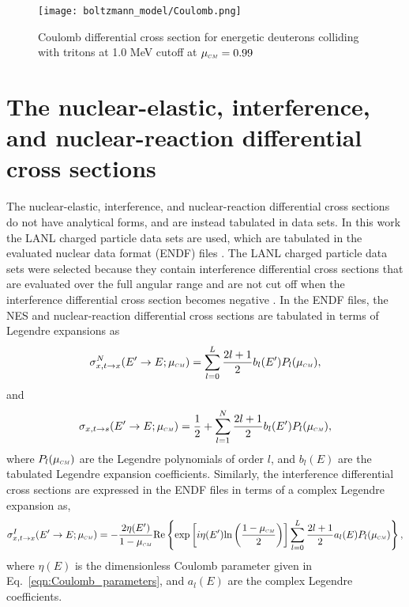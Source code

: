 \documentclass[../main.tex]{subfiles}
\begin{document}
\begin{figure}[!htb]
    \centering
    \texttt{[image: boltzmann\_model/Coulomb.png]}
    \caption{Coulomb differential cross section for energetic deuterons colliding with tritons at 1.0 MeV cutoff at $\mucm = 0.99$}
    \label{fig:sigma_c}
\end{figure}


\section{The nuclear-elastic, interference, and nuclear-reaction differential cross sections}
The nuclear-elastic, interference, and nuclear-reaction differential cross sections do not have analytical forms, and are instead tabulated in data sets. In this work the LANL charged particle data sets are used, which are tabulated in the evaluated nuclear data format (ENDF) files \cite{Brown-2018}. The LANL charged particle data sets were selected because they contain interference differential cross sections that are evaluated over the full angular range and are not cut off when the interference differential cross section becomes negative \cite{Perkins-1981} \cite{Hale-1983}. In the ENDF files, the NES and nuclear-reaction differential cross sections are tabulated in terms of Legendre expansions as
\begin{equation} \label{eqn:nes_differential cross section}
    \sigma_{x,t \rightarrow x}^N(E^{\prime} \rightarrow E; \mucm) = \sum_{l=0}^L \dfrac{2l+1}{2} b_l(E^{\prime}) P_l(\mucm),
\end{equation}
and
\begin{equation}\label{eqn:nuclear-reaction_differential cross section}
    \sigma_{x,t \rightarrow s}(E^{\prime} \rightarrow E; \mucm) = \dfrac{1}{2} + \sum_{l=1}^N \dfrac{2l+1}{2} b_l(E^{\prime}) P_l(\mucm),
\end{equation}
where $P_l(\mucm)$ are the Legendre polynomials of order $l$, and $b_l(E)$ are the tabulated Legendre expansion coefficients. Similarly, the interference differential cross sections are expressed in the ENDF files in terms of a complex Legendre expansion as,
\begin{equation} \label{eqn:interference_differential cross section}
    \sigma_{x,t \rightarrow x}^I(E^{\prime} \rightarrow E; \mucm) = -\dfrac{2 \eta(E^{\prime})}{1 - \mucm} \text{Re} \left\lbrace \text{exp}\left[ i \eta(E^{\prime}) \text{ln}\left(\frac{1 - \mucm}{2} \right)\right] \sum_{l=0}^L \dfrac{2l+1}{2} a_l(E) P_l(\mucm) \right\rbrace,
\end{equation}
where $\eta(E)$ is the dimensionless Coulomb parameter given in Eq.~\eqref{eqn:Coulomb_parameters}, and $a_l(E)$ are the complex Legendre coefficients.
\end{document}
